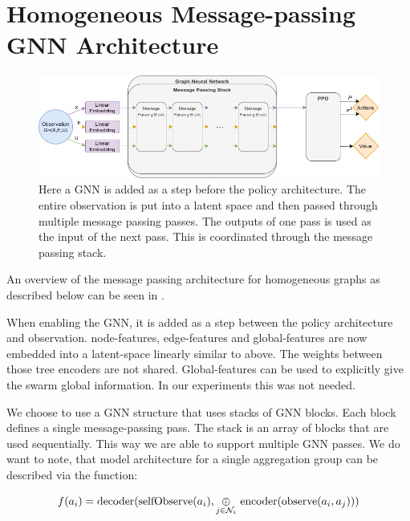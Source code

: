 \section{Homogeneous Message-passing GNN Architecture}
\begin{figure}[htp]
    \centering
    \includegraphics[width=1.0\textwidth]{figures/homogeneous_gnn.png}
    \hspace{1cm}   
    \caption{Here a GNN is added as a step before the policy architecture. The entire observation is put into a latent space and then passed through multiple message passing passes. The outputs of one pass is used as the input of the next pass. This is coordinated through the message passing stack.}
    \label{fig:homogeneous_gnn}
\end{figure}

An overview of the message passing architecture for homogeneous graphs as described below can be seen in .

When enabling the GNN, it is added as a step between the policy architecture and observation. node-features, edge-features and global-features are now embedded into a latent-space linearly similar to above. The weights between those tree encoders are not shared. Global-features can be used to explicitly give the swarm global information. In our experiments this was not needed. \par

We choose to use a GNN structure that uses stacks of GNN blocks. Each block defines a single message-passing pass. The stack is an array of blocks that are used sequentially. This way we are able to support multiple GNN passes. We do want to note, that  model architecture for a single aggregation group can be described via the function:

\begin{equation}
    f(a_i) = \textup{decoder(selfObserve}(a_i), \underset{j \in \mathcal{N}_i}{\oplus}\ \textup{encoder}(\textup{observe}(a_i, a_j))) \nonumber
\end{equation}

